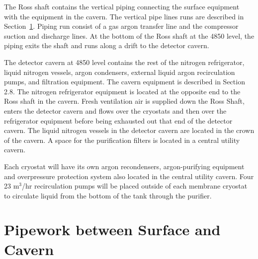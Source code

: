 The Ross shaft contains the vertical piping connecting the 
surface equipment with the equipment in the cavern. The vertical 
pipe lines runs are described in 
Section~\ref{sec:cryo-cryosys-pipework-surface-cav}. 
Piping run consist of a gas argon transfer line and the 
compressor suction and discharge lines. At the bottom of 
the Ross shaft at the 4850 level, the piping exits the 
shaft and runs along a drift to the detector cavern.

The detector cavern at 4850 level contains the rest of 
the nitrogen refrigerator, liquid nitrogen vessels, argon 
condensers, external liquid argon recirculation pumps, 
and filtration equipment. The cavern equipment is
 described in Section 2.8. The nitrogen refrigerator equipment is
located at the opposite end to the Ross shaft in the cavern. Fresh ventilation 
air is supplied down the Ross Shaft, enters the detector cavern 
and flows over the cryostats and then over the refrigerator
equipment before being exhausted out that end of the detector 
cavern. The liquid nitrogen vessels in the detector cavern 
are located in the crown of the cavern. A space for the
purification filters is located in a central utility cavern.

Each cryostat will have its own argon recondensers, 
argon-purifying equipment and overpressure protection system
also located in the central utility cavern. Four 23 m$^3$/hr 
recirculation pumps will be placed outside of each membrane 
cryostat to circulate 
liquid from the bottom of the tank through the purifier.


\chapter{Pipework between Surface and Cavern}
\label{sec:cryo-cryosys-pipework-surface-cav}

